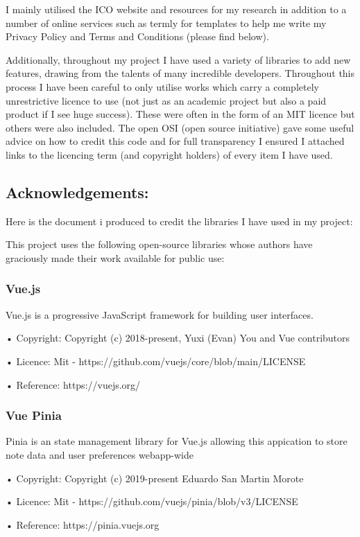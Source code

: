 I mainly utilised the ICO website and resources \cite{ICOOrganisations2025} for my research in addition to a number of online services such as termly for templates to help me write my Privacy Policy and Terms and Conditions (please find below).


Additionally, throughout my project I have used a variety of libraries to add new features, drawing from the talents of many incredible developers. Throughout this process I have been careful to only utilise works which carry a completely unrestrictive licence to use (not just as an academic project but also a paid product if I see huge success). These were often in the form of an MIT licence but others were also included. The open OSI (open source initiative) gave some useful advice on how to credit this code and for full transparency I ensured I attached links to the licencing term (and copyright holders) of every item I have used.

\subsection*{Acknowledgements:}
Here is the document i produced to credit the libraries I have used in my project:

This project uses the following open-source libraries whose authors have graciously made their work available for public use:
\subsubsection{Vue.js}
Vue.js is a progressive JavaScript framework for building user interfaces.

• Copyright: Copyright (c) 2018-present, Yuxi (Evan) You and Vue contributors

• Licence: Mit -  https://github.com/vuejs/core/blob/main/LICENSE

• Reference:  https://vuejs.org/

\subsubsection{Vue Pinia}
Pinia is an state management library for Vue.js allowing this appication to store note data and user preferences webapp-wide

• Copyright: Copyright (c) 2019-present Eduardo San Martin Morote

• Licence: Mit -  https://github.com/vuejs/pinia/blob/v3/LICENSE

• Reference:  https://pinia.vuejs.org

